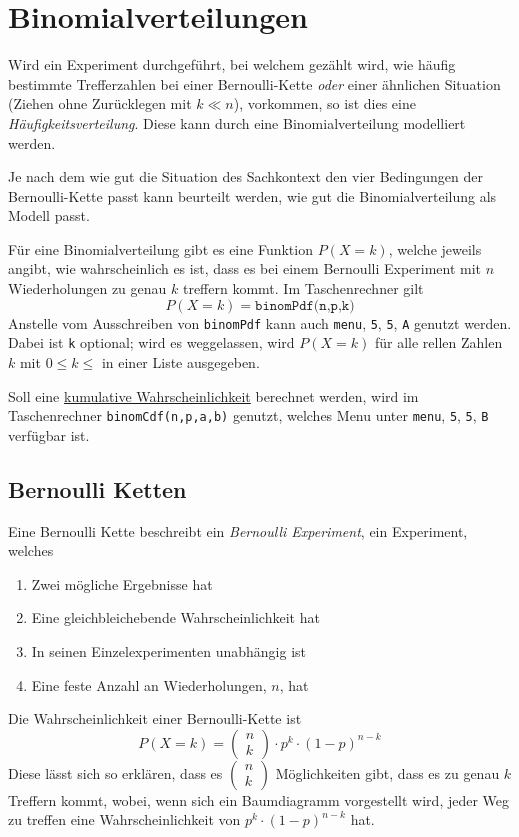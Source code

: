 \documentclass{article}
\begin{document}
\section{Binomialverteilungen}
Wird ein Experiment durchgeführt, bei welchem gezählt wird, wie häufig bestimmte Trefferzahlen bei einer Bernoulli-Kette \emph{oder} einer ähnlichen Situation (Ziehen ohne Zurücklegen mit $k \ll n$), vorkommen, so ist dies eine \emph{Häufigkeitsverteilung}. Diese kann durch eine Binomialverteilung modelliert werden.
 
Je nach dem wie gut die Situation des Sachkontext den vier Bedingungen der Bernoulli-Kette passt kann beurteilt werden, wie gut die Binomialverteilung als Modell passt. 
 
Für eine Binomialverteilung gibt es eine Funktion $P(X=k)$, welche jeweils angibt, wie wahrscheinlich es ist, dass es bei einem Bernoulli Experiment mit $n$ Wiederholungen zu genau $k$ treffern kommt. Im Taschenrechner gilt 
\[
 P(X=k)=\texttt{binomPdf(n,p,k)}
\]
Anstelle vom Ausschreiben von \texttt{binomPdf} kann auch \texttt{menu}, \texttt{5}, \texttt{5}, \texttt{A} genutzt werden. Dabei ist \texttt{k} optional; wird es weggelassen, wird $P(X=k)$ für alle rellen Zahlen $k$ mit $0 \leq k \leq$ in einer Liste ausgegeben.
 
Soll eine \hyperref[Kumulative Wahrscheinlichkeiten]{kumulative Wahrscheinlichkeit} berechnet werden, wird im Taschenrechner \texttt{binomCdf(n,p,a,b)} genutzt, welches Menu unter \texttt{menu}, \texttt{5}, \texttt{5}, \texttt{B} verfügbar ist.
 
\subsection{Bernoulli Ketten}
Eine Bernoulli Kette beschreibt ein \emph{Bernoulli Experiment}, ein Experiment, welches
\begin{enumerate}
 \item Zwei mögliche Ergebnisse hat
 \item Eine gleichbleichebende Wahrscheinlichkeit hat
 \item In seinen Einzelexperimenten unabhängig ist
 \item Eine feste Anzahl an Wiederholungen, $n$, hat 
\end{enumerate} 
Die Wahrscheinlichkeit einer Bernoulli-Kette ist
\[
 P(X=k) =
 \begin{pmatrix} n \\ k \end{pmatrix} \cdot
 p^k \cdot (1-p)^{n-k}
\]
Diese lässt sich so erklären, dass es $\begin{pmatrix} n \\ k \end{pmatrix}$ Möglichkeiten gibt, dass es zu genau $k$ Treffern kommt, wobei, wenn sich ein Baumdiagramm vorgestellt wird, jeder Weg zu treffen eine Wahrscheinlichkeit von $p^k \cdot (1-p)^{n-k}$ hat.
 
\end{document}
